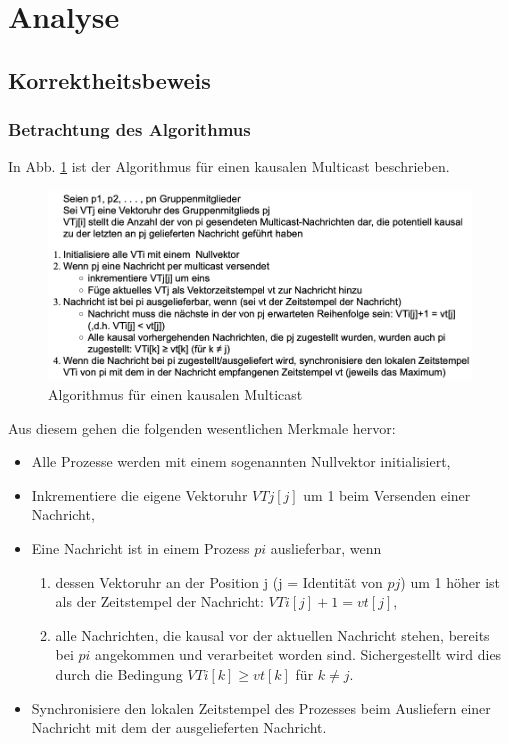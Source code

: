 \section{Analyse}

\subsection{Korrektheitsbeweis}

\subsubsection{Betrachtung des Algorithmus}

In Abb. \ref{definition_kausal} ist der Algorithmus für einen kausalen Multicast beschrieben.

\begin{figure}[htbp]
\begin{center}
\includegraphics[scale=0.4]{Latex/Bilder/Definition.png}
\caption{\label{definition_kausal} Algorithmus für einen kausalen Multicast \cite{Aufgabenstellung}}
\end{center}
\end{figure}

Aus diesem gehen die folgenden wesentlichen Merkmale hervor:

\begin{itemize}
    \item Alle Prozesse werden mit einem sogenannten Nullvektor initialisiert,
    \item Inkrementiere die eigene Vektoruhr $VTj[j]$ um 1 beim Versenden einer Nachricht,
    \item Eine Nachricht ist in einem Prozess $pi$ auslieferbar, wenn
        \begin{enumerate}
            \item dessen Vektoruhr an der Position j (j = Identität von $pj$) um 1 höher ist als der Zeitstempel der Nachricht: $VTi[j]+1 = vt[j]$,
            \item alle Nachrichten, die kausal vor der aktuellen Nachricht stehen, bereits bei $pi$ angekommen und verarbeitet worden sind. Sichergestellt wird dies durch die Bedingung $VTi[k]\geq vt[k]$ für $k \neq j$.
        \end{enumerate}
    \item Synchronisiere den lokalen Zeitstempel des Prozesses beim Ausliefern einer Nachricht mit dem der ausgelieferten Nachricht.
\end{itemize}



